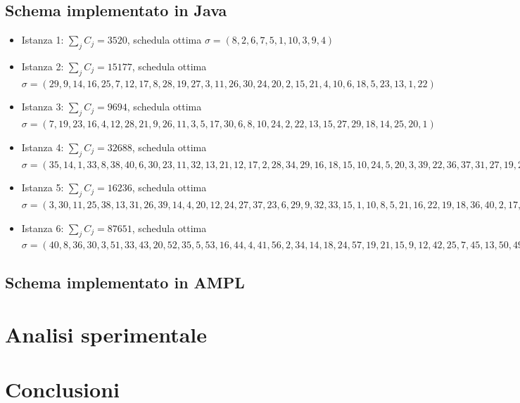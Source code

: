 \documentclass[a4paper]{article}
\begin{document}
\subsection{Schema implementato in Java}
	\begin{itemize}
		\item Istanza 1: $\sum_{j} C_j = 3520$, schedula ottima $\sigma = (8, 2, 6, 7, 5, 1, 10, 3, 9, 4)$
		\item Istanza 2: $\sum_{j} C_j = 15177$, schedula ottima $\sigma = (29, 9, 14, 16, 25, 7, 12, 17, 8, 28, 19, 27, 3, 11, 26, 30, 24, 20, 2, 15, 21, 4, 10, 6, 18, 5, 23, 13, 1, 22)$
		\item Istanza 3: $\sum_{j} C_j = 9694$, schedula ottima $\sigma = (7, 19, 23, 16, 4, 12, 28, 21, 9, 26, 11, 3, 5, 17, 30, 6, 8, 10, 24, 2, 22, 13, 15, 27, 29, 18, 14, 25, 20, 1)$
		\item Istanza 4: $\sum_{j} C_j = 32688$, schedula ottima $\sigma = (35, 14, 1, 33, 8, 38, 40, 6, 30, 23, 11, 32, 13, 21, 12, 17, 2, 28, 34, 29, 16, 18, 15, 10, 24, 5, 20, 3, 39, 22, 36, 37, 31, 27, 19, 25, 4, 7, 26, 9)$
		\item Istanza 5: $\sum_{j} C_j = 16236$, schedula ottima $\sigma = (3, 30, 11, 25, 38, 13, 31, 26, 39, 14, 4, 20, 12, 24, 27, 37, 23, 6, 29, 9, 32, 33, 15, 1, 10, 8, 5, 21, 16, 22, 19, 18, 36, 40, 2, 17, 28, 34, 7, 35)$
		\item Istanza 6: $\sum_{j} C_j = 87651$, schedula ottima $\sigma = (40, 8, 36, 30, 3, 51, 33, 43, 20, 52, 35, 5, 53, 16, 44, 4, 41, 56, 2, 34, 14, 18, 24, 57, 19, 21, 15, 9, 12, 42, 25, 7, 45, 13, 50, 49, 59, 17, 55, 58, 47, 1, 27, 11, 28, 37, 38, 10, 54, 23, 48, 31, 6, 29, 26, 32, 60, 46, 22, 39)$
	\end{itemize}
\subsection{Schema implementato in AMPL}

\section{Analisi sperimentale}
\section{Conclusioni}
\end{document}
